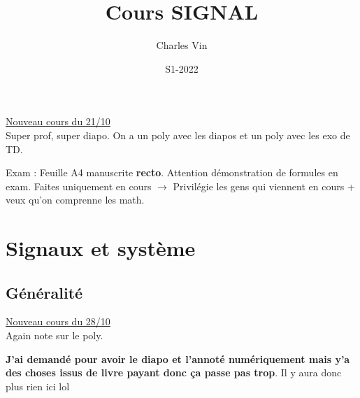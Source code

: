\documentclass{article}
\title{Cours SIGNAL}
\author{Charles Vin}
\date{S1-2022}
\theoremstyle{plain}%
\theoremstyle{definition}
\theoremstyle{remark}
\begin{document}
\maketitle

\underline{Nouveau cours du 21/10} \\

Super prof, super diapo. On a un poly avec les diapos et un poly avec les exo de TD.

Exam : Feuille A4 manuscrite \textbf{recto}. Attention démonstration de formules en exam. Faites uniquement en cours $\rightarrow$ Privilégie les gens qui viennent en cours + veux qu'on comprenne les math.

\section{Signaux et système}
\subsection{Généralité}

\underline{Nouveau cours du 28/10} \\
Again note sur le poly.

\textbf{J'ai demandé pour avoir le diapo et l'annoté numériquement mais y'a des choses issus de livre payant donc ça passe pas trop}. Il y aura donc plus rien ici lol
\end{document}
